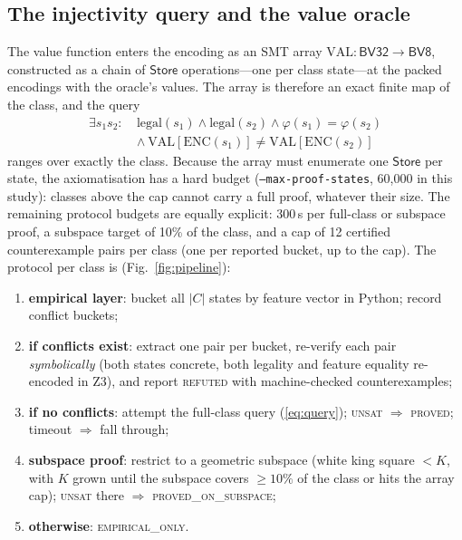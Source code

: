 \documentclass[conference]{IEEEtran}
\begin{document}
\subsection{The injectivity query and the value oracle}
The value function enters the encoding as an SMT array
$\mathrm{VAL} : \mathsf{BV32} \to \mathsf{BV8}$, constructed as a chain of
$\mathsf{Store}$ operations---one per class state---at the packed encodings
with the oracle's values. The array is therefore an exact finite map of the
class, and the query
\begin{equation}
\begin{aligned}
\exists s_1 s_2:\ &\mathrm{legal}(s_1) \wedge \mathrm{legal}(s_2) \wedge
\varphi(s_1) = \varphi(s_2)\\
&\wedge\ \mathrm{VAL}[\mathrm{ENC}(s_1)] \neq \mathrm{VAL}[\mathrm{ENC}(s_2)]
\end{aligned}
\label{eq:query}
\end{equation}
ranges over exactly the class. Because the array must enumerate one
$\mathsf{Store}$ per state, the axiomatisation has a hard budget
(\texttt{--max-proof-states}, 60{,}000 in this study): classes above the
cap cannot carry a full proof, whatever their size. The remaining protocol
budgets are equally explicit: 300\,s per full-class or subspace proof, a
subspace target of 10\% of the class, and a cap of 12 certified
counterexample pairs per class (one per reported bucket, up to the cap).
The protocol per class
is (Fig.~\ref{fig:pipeline}):
\begin{enumerate}
\item \textbf{empirical layer}: bucket all $|C|$ states by feature vector
in Python; record conflict buckets;
\item \textbf{if conflicts exist}: extract one pair per bucket, re-verify
each pair \emph{symbolically} (both states concrete, both legality and
feature equality re-encoded in Z3), and report \textsc{refuted} with
machine-checked counterexamples;
\item \textbf{if no conflicts}: attempt the full-class query
(\ref{eq:query}); \textsc{unsat} $\Rightarrow$ \textsc{proved}; timeout
$\Rightarrow$ fall through;
\item \textbf{subspace proof}: restrict to a geometric subspace (white king
square $< K$, with $K$ grown until the subspace covers $\ge 10\%$ of the
class or hits the array cap); \textsc{unsat} there $\Rightarrow$
\textsc{proved\_on\_subspace};
\item \textbf{otherwise}: \textsc{empirical\_only}.
\end{enumerate}
\end{document}
